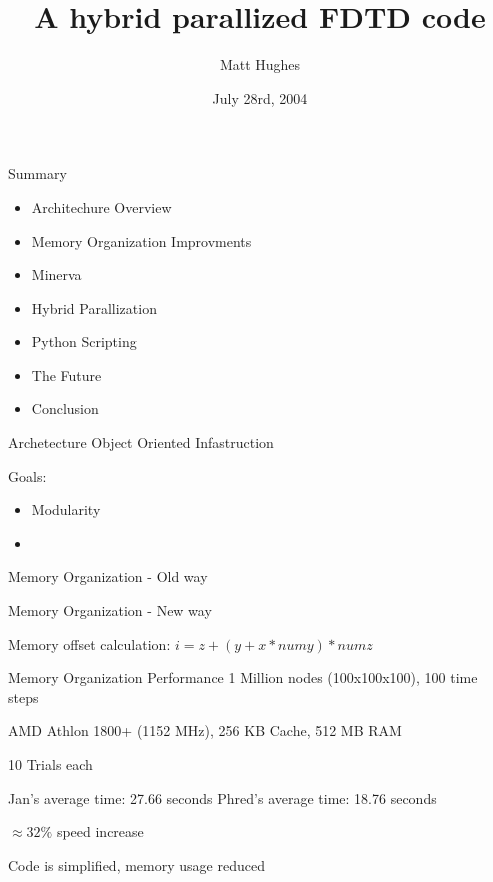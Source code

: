 \documentclass[pdf, nototal, slideBW]{prosper}
\title{A hybrid parallized FDTD code}
\author{Matt Hughes}
\date{July 28rd, 2004}
\newcommand{\insgraphic}[2]{
  \begin{center}
    \scalebox{#1}{
      \texttt{[image: \#2]}
    }
  \end{center}
}
\begin{document}
\maketitle

\begin{slide}{Summary}

  \begin{itemize}
    \item Architechure Overview 
    \item Memory Organization Improvments
    \item Minerva
    \item Hybrid Parallization
    \item Python Scripting
    \item The Future
    \item Conclusion
  \end{itemize}

\end{slide}

\begin{slide}{Archetecture}
  Object Oriented Infastruction

  Goals:
  \begin{itemize}
  \item Modularity
  \item 
  \end{itemize}
\end{slide}

\begin{slide}{Memory Organization - Old way}
  \insgraphic{1}{jan-memory.eps}
\end{slide}

\begin{slide}{Memory Organization - New way}
  \insgraphic{1}{phred-memory.eps}

  Memory offset calculation: $i = z + (y + x * numy) * numz$
\end{slide}

\begin{slide}{Memory Organization Performance}
  1 Million nodes (100x100x100), 100 time steps
  \vspace{0.5cm}

  AMD Athlon 1800+ (1152 MHz), 256 KB Cache, 512 MB RAM
  \vspace{0.5cm}
  
  10 Trials each
  \vspace{0.5cm}

  Jan's average time: 27.66 seconds
  Phred's average time: 18.76 seconds
  \vspace{0.5cm}

  $\approx 32\%$ speed increase
  \vspace{0.5cm}

  Code is simplified, memory usage reduced
\end{slide}
\end{document}
